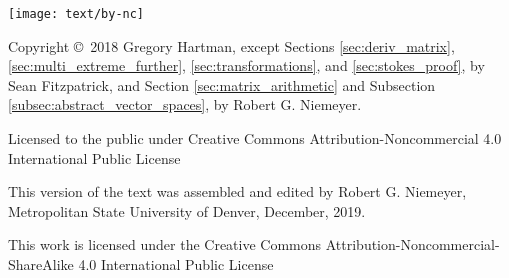 \noindent\hskip -1in\begin{minipage}{2in}
\texttt{[image: text/by-nc]} 
\end{minipage}
%
\begin{minipage}{3in}
\noindent Copyright \copyright\ 2018 Gregory Hartman, except Sections \ref{sec:deriv_matrix}, \ref{sec:multi_extreme_further}, \ref{sec:transformations}, and \ref{sec:stokes_proof}, by Sean Fitzpatrick, and Section \ref{sec:matrix_arithmetic} and Subsection \ref{subsec:abstract_vector_spaces}, by Robert G. Niemeyer.

Licensed to the public under Creative Commons Attribution-Noncommercial 4.0 International Public License
\end{minipage}

\bigskip

\bigskip



\bigskip

\begin{minipage}{3.3in}
This version of the text was assembled and edited by Robert G. Niemeyer, Metropolitan State University of Denver, December, 2019.

This work is licensed under the Creative Commons Attribution-Noncommercial-ShareAlike 4.0 International Public License
\end{minipage}
